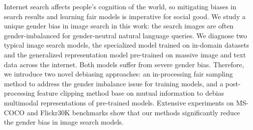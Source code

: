 Internet search affects people's cognition of the world, so mitigating biases in search results and learning fair models is imperative for social good. We study a unique gender bias in image search in this work: the search images are often gender-imbalanced for gender-neutral natural language queries. We diagnose two typical image search models, the specialized model trained on in-domain datasets and the generalized representation model pre-trained on massive image and text data across the internet. Both models suffer from severe gender bias. Therefore, we introduce two novel debiasing approaches: an in-processing fair sampling method to address the gender imbalance issue for training models, and a post-processing feature clipping method base on mutual information to debias multimodal representations of pre-trained models. Extensive experiments on MS-COCO and Flickr30K benchmarks show that our methods significantly reduce the gender bias in image search models.
